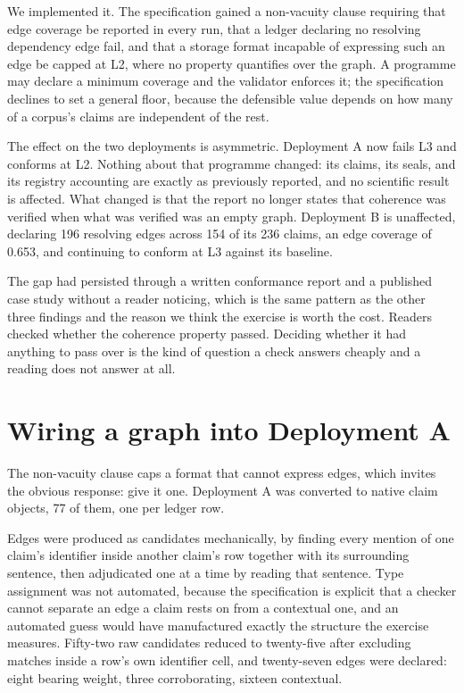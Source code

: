\documentclass[journal]{IEEEtran}
\begin{document}
We implemented it. The specification gained a non-vacuity clause requiring that
edge coverage be reported in every run, that a ledger declaring no resolving
dependency edge fail, and that a storage format incapable of expressing such an
edge be capped at L2, where no property quantifies over the graph. A programme
may declare a minimum coverage and the validator enforces it; the specification
declines to set a general floor, because the defensible value depends on how many
of a corpus's claims are independent of the rest.

The effect on the two deployments is asymmetric. Deployment A now fails L3 and
conforms at L2. Nothing about that programme changed: its claims, its seals, and
its registry accounting are exactly as previously reported, and no scientific
result is affected. What changed is that the report no longer states that
coherence was verified when what was verified was an empty graph. Deployment B is
unaffected, declaring 196 resolving edges across 154 of its 236 claims, an edge
coverage of 0.653, and continuing to conform at L3 against its baseline.

The gap had persisted through a written conformance report and a published case
study without a reader noticing, which is the same pattern as the other three
findings and the reason we think the exercise is worth the cost. Readers checked
whether the coherence property passed. Deciding whether it had anything to pass
over is the kind of question a check answers cheaply and a reading does not
answer at all.

\section{Wiring a graph into Deployment A}
\label{sec:spine}

The non-vacuity clause caps a format that cannot express edges, which invites the
obvious response: give it one. Deployment A was converted to native claim
objects, 77 of them, one per ledger row.

Edges were produced as candidates mechanically, by finding every mention of one
claim's identifier inside another claim's row together with its surrounding
sentence, then adjudicated one at a time by reading that sentence. Type
assignment was not automated, because the specification is explicit that a
checker cannot separate an edge a claim rests on from a contextual one, and an
automated guess would have manufactured exactly the structure the exercise
measures. Fifty-two raw candidates reduced to twenty-five after excluding matches
inside a row's own identifier cell, and twenty-seven edges were declared: eight
bearing weight, three corroborating, sixteen contextual.
\end{document}
